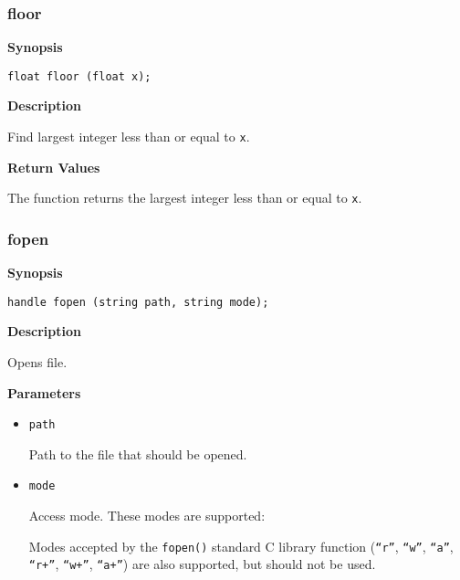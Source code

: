 \documentclass[a4paper, 10pt, titlepage]{article}
\begin{document}
\subsubsection{floor}

\textbf{Synopsis}

\begin{verbatim}
float floor (float x);
\end{verbatim}

\textbf{Description}

Find largest integer less than or equal to \texttt{x}.

\textbf{Return Values}

The function returns the largest integer less than or equal to \texttt{x}.

\subsubsection{fopen}

\textbf{Synopsis}

\begin{verbatim}
handle fopen (string path, string mode);
\end{verbatim}

\textbf{Description}

Opens file.

\textbf{Parameters}

\begin{itemize}
\item \texttt{path}

Path to the file that should be opened.

\item \texttt{mode}

Access mode. These modes are supported:

Modes accepted by the \texttt{fopen()} standard C library function (\texttt{``r''}, \texttt{``w''}, \texttt{``a''}, \texttt{``r+''}, \texttt{``w+''}, \texttt{``a+''}) are also supported, but should not be used.
\end{itemize}
\end{document}
